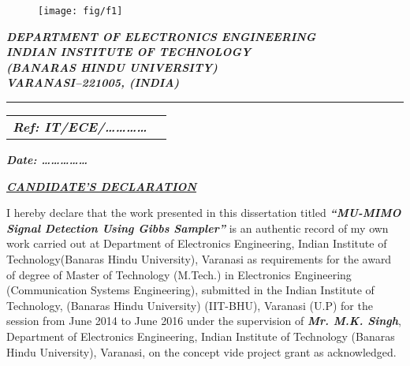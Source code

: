 \thispagestyle{empty}
\begin{minipage}[t]{0.42\linewidth}
\begin{figure}[H]
\texttt{[image: fig/f1]}
\end{figure}
\end{minipage}
\vspace{.8 cm}
\begin{minipage}[t]{0.729999\linewidth}
\vspace{1.0 cm}
\textbf{\textit{{\color{blue}DEPARTMENT OF ELECTRONICS ENGINEERING}}}\\
\textbf{\textit{{\color{blue}\hspace{55pt} INDIAN INSTITUTE OF TECHNOLOGY}}}\\
\textbf{\textit{{\color{blue}\hspace{82pt}(BANARAS HINDU UNIVERSITY)}}}\\
\textbf{\textit{{\color{blue} \hspace{108pt}VARANASI–221005, (INDIA)}}}
\vspace{1.0 cm}
\end{minipage}
\hrule
\vspace{.5cm}
\par
\begin{minipage}[t]{0.75\linewidth}
\begin{tabular}{ll}
\textbf{\textit{{\color{blue}Ref: IT/ECE/…………}}} 
\end{tabular} 
\end{minipage}
\begin{minipage}[t]{0.75\linewidth}
\textbf{\textit{{\color{blue}Date: ……………}}}
\end{minipage}
\begin{center}
\textbf{\textit{{\color{blue}\underline{CANDIDATE’S DECLARATION}}}}
\end{center}
I hereby declare that the work presented in this dissertation titled \textbf{\textit{\textit{{\color{blue}“MU-MIMO Signal Detection Using Gibbs Sampler” }}}} is an authentic record of my own work carried out at Department of Electronics Engineering, Indian Institute of Technology(Banaras Hindu University), Varanasi as requirements for the award of degree of Master of Technology (M.Tech.) in Electronics Engineering (Communication Systems Engineering), submitted in the Indian Institute of Technology, (Banaras Hindu University) (IIT-BHU), Varanasi (U.P) for the session from June 2014 to June 2016 under the supervision of\textbf{\textit{ \textit{{\color{blue}Mr. M.K. Singh}}}}, Department of Electronics Engineering, Indian Institute of Technology (Banaras Hindu University), Varanasi, on the concept vide project grant as acknowledged.

